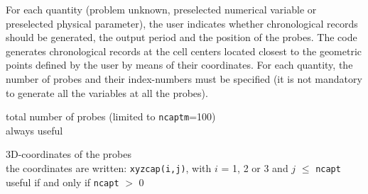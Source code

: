 For each quantity (problem unknown, preselected numerical variable or
preselected physical parameter), the user indicates whether chronological records
should be generated, the output period and the position of the
probes. The code generates chronological records at the cell centers located
closest to the geometric points defined by the user by means of their
coordinates. For each quantity, the number of probes and their
index-numbers must be specified (it is not mandatory to generate all
the variables at all the probes).


{total number of probes (limited to {\tt ncaptm}=100)\\
always useful }

{3D-coordinates of the probes\\
the coordinates are written: {\tt xyzcap(i,j)}, with $i$ = 1, 2 or 3 and $j$
$\leqslant$ {\tt ncapt}\\
useful if and only if {\tt ncapt} $>$ 0}

